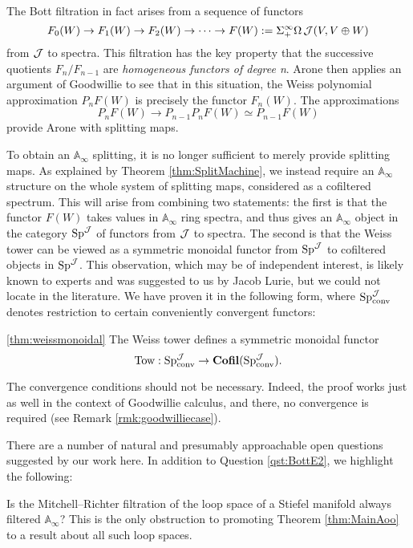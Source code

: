The Bott filtration in fact arises from a sequence of functors $$F_0(W) \to F_1(W) \to F_2(W) \to \cdots \to F(W) := \Sigma^{\infty}_+ \Omega \operatorname{\mathcal{J}}(V, V\oplus W)$$ from $\operatorname{\mathcal{J}}$ to spectra.  This filtration has the key property that the successive quotients $F_n/F_{n-1}$ are \emph{homogeneous functors of degree n}.  Arone then applies an argument of Goodwillie \cite[Example 1.20]{GoodwillieIII} to see that in this situation, the Weiss polynomial approximation $P_n F(W)$ is precisely the functor $F_n(W)$.  The approximations $$P_n F(W) \rightarrow P_{n-1} P_n F(W) \simeq P_{n-1} F(W)$$ provide Arone with splitting maps.

To obtain an $\mathbb{A}_\infty$ splitting, it is no longer sufficient to merely provide splitting maps.  As explained by Theorem \ref{thm:SplitMachine}, we instead require an $\mathbb{A}_\infty$ structure on the whole system of splitting maps, considered as a cofiltered spectrum.  This will arise from combining two statements: the first is that the functor $F(W)$ takes values in $\mathbb{A}_\infty$ ring spectra, and thus gives an $\mathbb{A}_\infty$ object in the category $\operatorname{\mathrm{Sp}}^{\operatorname{\mathcal{J}}}$ of functors from $\operatorname{\mathcal{J}}$ to spectra.  The second is that the Weiss tower can be viewed as a symmetric monoidal functor from $\operatorname{\mathrm{Sp}}^{\operatorname{\mathcal{J}}}$ to cofiltered objects in $\operatorname{\mathrm{Sp}}^{\operatorname{\mathcal{J}}}$.  This observation, which may be of independent interest, is likely known to experts and was suggested to us by Jacob Lurie, but we could not locate in the literature.  We have proven it in the following form, where $\operatorname{\mathrm{Sp}}^{\operatorname{\mathcal{J}}}_{\text{conv}}$ denotes restriction to certain conveniently convergent functors:
\begin{customthm}{\ref{thm:weissmonoidal}}
The Weiss tower defines a symmetric monoidal functor $$\text{Tow}: \operatorname{\mathrm{Sp}}^{\operatorname{\mathcal{J}}}_{\text{conv}} \to \operatorname{\mathbf{Cofil}}(\operatorname{\mathrm{Sp}}^{\operatorname{\mathcal{J}}}_{\text{conv}}).$$
\end{customthm}
\begin{rmk*}
The convergence conditions should not be necessary.  Indeed, the proof works just as well in the context of Goodwillie calculus, and there, no convergence is required (see Remark \ref{rmk:goodwilliecase}).  
\end{rmk*}

There are a number of natural and presumably approachable open questions suggested by our work here.  In addition to Question \ref{qst:BottE2}, we highlight the following:

\begin{qst}
Is the Mitchell--Richter filtration of the loop space of a Stiefel manifold always filtered $\mathbb{A}_\infty$?  This is the only obstruction to promoting Theorem \ref{thm:MainAoo} to a result about all such loop spaces.
\end{qst}

